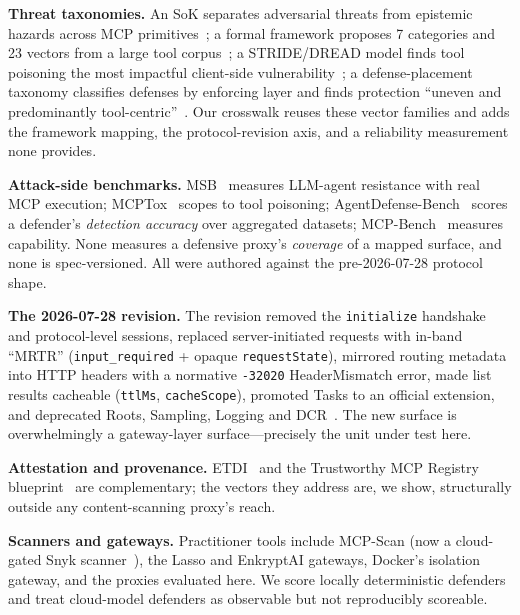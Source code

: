 \documentclass[conference]{IEEEtran}
\newcommand{\rev}{2026-07-28}
\begin{document}
\textbf{Threat taxonomies.} An SoK separates adversarial threats from epistemic hazards across MCP primitives~\cite{sok2512}; a formal framework proposes 7 categories and 23 vectors from a large tool corpus~\cite{formal2604}; a STRIDE/DREAD model finds tool poisoning the most impactful client-side vulnerability~\cite{stride2603}; a defense-placement taxonomy classifies defenses by enforcing layer and finds protection ``uneven and predominantly tool-centric''~\cite{mcpdpt2604}. Our crosswalk reuses these vector families and adds the framework mapping, the protocol-revision axis, and a reliability measurement none provides.

\textbf{Attack-side benchmarks.} MSB~\cite{msb2510} measures LLM-agent resistance with real MCP execution; MCPTox~\cite{mcptox2508} scopes to tool poisoning; AgentDefense-Bench~\cite{agentdefensebench} scores a defender's \emph{detection accuracy} over aggregated datasets; MCP-Bench~\cite{mcpbench2508} measures capability. None measures a defensive proxy's \emph{coverage} of a mapped surface, and none is spec-versioned. All were authored against the pre-\rev{} protocol shape.

\textbf{The \rev{} revision.} The revision removed the \texttt{initialize} handshake and protocol-level sessions, replaced server-initiated requests with in-band ``MRTR'' (\texttt{input\_required} + opaque \texttt{requestState}), mirrored routing metadata into HTTP headers with a normative \texttt{-32020} HeaderMismatch error, made list results cacheable (\texttt{ttlMs}, \texttt{cacheScope}), promoted Tasks to an official extension, and deprecated Roots, Sampling, Logging and DCR~\cite{mcpspec20260728}. The new surface is overwhelmingly a gateway-layer surface---precisely the unit under test here.

\textbf{Attestation and provenance.} ETDI~\cite{etdi2506} and the Trustworthy MCP Registry blueprint~\cite{trustreg2026} are complementary; the vectors they address are, we show, structurally outside any content-scanning proxy's reach.

\textbf{Scanners and gateways.} Practitioner tools include MCP-Scan (now a cloud-gated Snyk scanner~\cite{snykagentscan}), the Lasso and EnkryptAI gateways, Docker's isolation gateway, and the proxies evaluated here. We score locally deterministic defenders and treat cloud-model defenders as observable but not reproducibly scoreable.
\end{document}
